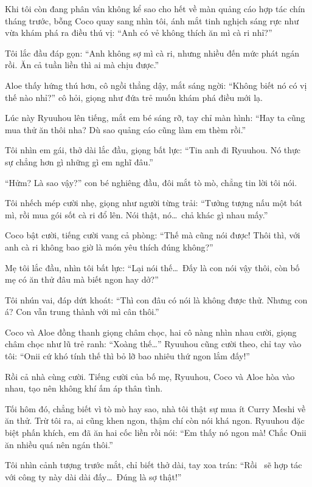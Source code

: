\documentclass[../main.tex]{subfiles}
\begin{document}
Khi tôi còn đang phân vân không kể sao cho hết về màn quảng cáo hợp tác chín tháng trước, bỗng Coco quay sang nhìn tôi, ánh mắt tinh nghịch sáng rực như vừa khám phá ra điều thú vị: ``Anh có vẻ không thích ăn mì cà ri nhỉ?''

Tôi lắc đầu đáp gọn: ``Anh không sợ mì cà ri, nhưng nhiều đến mức phát ngán rồi. Ăn cả tuần liền thì ai mà chịu được.''

Aloe thấy hứng thú hơn, cô ngồi thẳng dậy, mắt sáng ngời: ``Không biết nó có vị thế nào nhỉ?'' cô hỏi, giọng như đứa trẻ muốn khám phá điều mới lạ.

Lúc này Ryuuhou lên tiếng, mắt em bé sáng rỡ, tay chỉ màn hình: ``Hay ta cũng mua thử ăn thôi nha? Dù sao quảng cáo cũng làm em thèm rồi.''

Tôi nhìn em gái, thở dài lắc đầu, giọng bất lực: ``Tin anh đi Ryuuhou. Nó thực sự chẳng hơn gì những gì em nghĩ đâu.''

``Hửm? Là sao vậy?'' con bé nghiêng đầu, đôi mắt tò mò, chẳng tin lời tôi nói.

Tôi nhếch mép cười nhẹ, giọng như người từng trải: ``Tưởng tượng nấu một bát mì, rồi mua gói sốt cà ri đổ lên. Nói thật, nó\dots\ chả khác gì nhau mấy.''

Coco bật cười, tiếng cười vang cả phòng: ``Thế mà cũng nói được! Thôi thì, với anh cà ri không bao giờ là món yêu thích đúng không?''

Mẹ tôi lắc đầu, nhìn tôi bất lực: ``Lại nói thế\dots\ Đấy là con nói vậy thôi, còn bố mẹ có ăn thử đâu mà biết ngon hay dở?''

Tôi nhún vai, đáp dứt khoát: ``Thì con đâu có nói là không được thử. Nhưng con á? Con vẫn trung thành với mì cân thôi.''

Coco và Aloe đồng thanh giọng châm chọc, hai cô nàng nhìn nhau cười, giọng châm chọc như lũ trẻ ranh: ``Xoàng thế\dots'' Ryuuhou cũng cười theo, chỉ tay vào tôi: ``Onii cứ khó tính thế thì bỏ lỡ bao nhiêu thứ ngon lắm đấy!''

Rồi cả nhà cùng cười. Tiếng cười của bố mẹ, Ryuuhou, Coco và Aloe hòa vào nhau, tạo nên không khí ấm áp thân tình.

Tối hôm đó, chẳng biết vì tò mò hay sao, nhà tôi thật sự mua ít Curry Meshi về ăn thử. Trừ tôi ra, ai cũng khen ngon, thậm chí còn nói khá ngon. Ryuuhou đặc biệt phấn khích, em đã ăn hai cốc liền rồi nói: ``Em thấy nó ngon mà! Chắc Onii ăn nhiều quá nên ngán thôi.''

Tôi nhìn cảnh tượng trước mắt, chỉ biết thở dài, tay xoa trán: ``Rồi \hll\ sẽ hợp tác với công ty này dài dài đấy\dots\ Đúng là sợ thật!''
\end{document}
